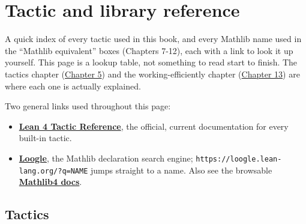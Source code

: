 \chapter*{Tactic and library reference}
\setcounter{section}{0}\label{sec:root:tactic-and-library-reference:1}

A quick index of every tactic used in this book, and every Mathlib name used in the ``Mathlib equivalent'' boxes (Chapters 7-12), each with a link to look it up yourself. This page is a lookup table, not something to read start to finish. The tactics chapter (\hyperref[sec:05-tactics:00-index:1]{Chapter 5}) and the working-efficiently chapter (\hyperref[sec:13-working-efficiently:00-index:1]{Chapter 13}) are where each one is actually explained.

Two general links used throughout this page:

\begin{itemize}
\tightlist
\item
  \textbf{\href{https://lean-lang.org/doc/reference/latest/Tactic-Proofs/Tactic-Reference/}{Lean 4 Tactic Reference}}, the official, current documentation for every built-in tactic.
\item
  \textbf{\href{https://loogle.lean-lang.org/}{Loogle}}, the Mathlib declaration search engine; \texttt{https:/\allowbreak{}/\allowbreak{}loogle.lean-\allowbreak{}lang.org/\allowbreak{}?q=NAME} jumps straight to a name. Also see the browsable \textbf{\href{https://leanprover-community.github.io/mathlib4_docs/}{Mathlib4 docs}}.
\end{itemize}

\section*{Tactics}
\label{sec:root:tactic-and-library-reference:2}

